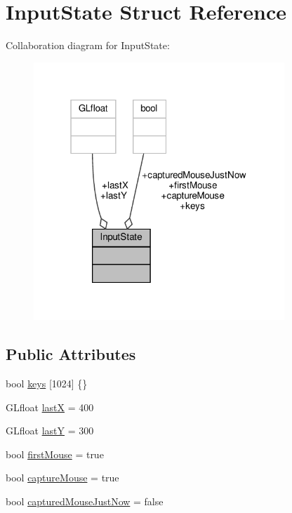 \hypertarget{structInputState}{}\section{Input\+State Struct Reference}
\label{structInputState}


Collaboration diagram for Input\+State\+:\nopagebreak
\begin{figure}[H]
\begin{center}
\leavevmode
\includegraphics[width=268pt]{structInputState__coll__graph}
\end{center}
\end{figure}
\subsection*{Public Attributes}
\begin{DoxyCompactItemize}
\item 
bool \hyperlink{structInputState_a6821699434a96ab81583ec2b43f0fc0b}{keys} \mbox{[}1024\mbox{]} \{\}
\item 
G\+Lfloat \hyperlink{structInputState_a5dd10a0ab1fc5f4275a26335d733c79b}{lastX} = 400
\item 
G\+Lfloat \hyperlink{structInputState_a0eda88bc636b0b2a150caa48310a05e3}{lastY} = 300
\item 
bool \hyperlink{structInputState_a289aa049f05b5fad72c9f2c772d99c1e}{first\+Mouse} = true
\item 
bool \hyperlink{structInputState_a0f1bccefb8c7067c973c423692295420}{capture\+Mouse} = true
\item 
bool \hyperlink{structInputState_a2f8fa6ce827fe9a9310cc6c4ebccb1f8}{captured\+Mouse\+Just\+Now} = false
\end{DoxyCompactItemize}


